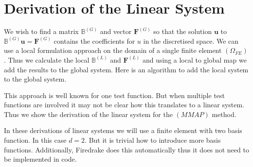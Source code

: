 \documentclass[12pt]{ociamthesis}
\begin{document}
\section{Derivation of the Linear System}
We wish to find a matrix $\mathbb{B}^{(G)}$ and vector $\mathbf{F}^{(G)}$ so that the solution $\mathbf{u}$ to $\mathbb{B}^{(G)} \mathbf{u} = \mathbf{F}^{(G)}$ contains the coefficients for $u$ in the discretised space. We can use a local formulation approach on the domain of a single finite element $(\Omega_{FE})$. Thus we calculate the local $\mathbb{B}^{(L)}$ and $\mathbf{F}^{(L)}$ and using a local to global map we add the results to the global system. Here is an algorithm to add the local system to the global system.

This approach is well known for one test function. But when multiple test functions are involved it may not be clear how this translates to a linear system. Thus we show the derivation of the linear system for the $(MMAP)$ method.

In these derivations of linear systems we will use a finite element with two basis function. In this case $d=2$. But it is trivial how to introduce more basis functions. Additionally, Firedrake \cite{Dragon} does this automatically thus it does not need to be implemented in code.
\end{document}
